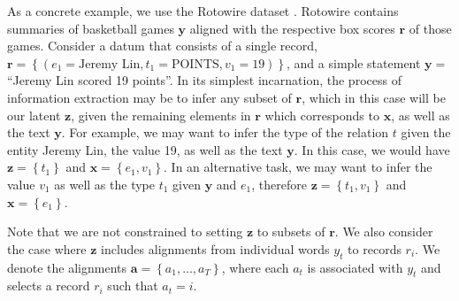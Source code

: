\documentclass[11pt]{article}
\newcommand\set[1]{\left\{#1\right\}}
\newcommand{\ba}{\mathbf{a}}
\newcommand{\br}{\mathbf{r}}
\newcommand{\bx}{\mathbf{x}}
\newcommand{\by}{\mathbf{y}}
\newcommand{\bz}{\mathbf{z}}
\begin{document}
As a concrete example, we use the Rotowire dataset \citep{wiseman2017d2t}.
Rotowire contains summaries of basketball games $\by$ aligned with the respective
box scores $\br$ of those games.
Consider a datum that consists of a single record,
$\br = \set{(e_1 = \textrm{Jeremy Lin}, t_1 = \textrm{POINTS}, v_1 = 19)}$,
and a simple statement $\by = $``Jeremy Lin scored 19 points''.
In its simplest incarnation, the process of information extraction may be to infer any
subset of $\br$, which in this case will be our latent $\bz$, given the remaining elements in $\br$
which corresponds to $\bx$, as well as the text $\by$.
For example, we may want to infer the type of the relation $t$ given 
the entity Jeremy Lin, the value 19, as well as the text $\by$.
In this case, we would have $\bz = \set{t_1}$ and $\bx = \set{e_1,v_1}$.
In an alternative task, we may want to infer the value $v_1$ 
as well as the type $t_1$ given $\by$ and $e_1$, therefore $\bz = \set{t_1,v_1}$ and $\bx=\set{e_1}$.

Note that we are not constrained to setting $\bz$ to subsets of $\br$.
We also consider the case where $\bz$ includes alignments from individual words $y_t$
to records $r_i$. We denote the alignments $\ba = \set{a_1,\ldots,a_T}$,
where each $a_t$ is associated with $y_t$ and selects a record $r_i$ such that $a_t = i$.
\end{document}
